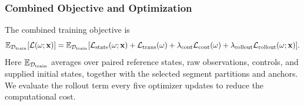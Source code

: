\subsubsection{Combined Objective and Optimization}
The combined training objective is
\begin{equation}\label{eq:normflowsde_loss}
 \mathbb E_{\mathcal D_{\mathrm{train}}}
 [\mathcal L(\omega;\mathbf x)] = \mathbb E_{\mathcal D_{\mathrm{train}}}
 [\mathcal L_{\mathrm{state}}(\omega;\mathbf x)
 +\mathcal L_{\mathrm{trans}}(\omega)+\lambda_{\mathrm{cont}}\mathcal L_{\mathrm{cont}}(\omega)
 +\lambda_{\mathrm{rollout}}\mathcal L_{\mathrm{rollout}}(\omega;\mathbf x)].
 \end{equation}
Here $\mathbb E_{\mathcal D_{\mathrm{train}}}$ averages over paired reference states, raw observations, controls, and supplied initial states, together with the selected segment partitions and anchors. We evaluate the rollout term every five optimizer updates to reduce the computational cost. 
